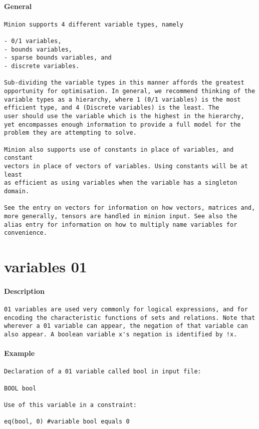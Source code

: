 \paragraph{General}
{\footnotesize
\begin{verbatim}
Minion supports 4 different variable types, namely

- 0/1 variables,
- bounds variables,
- sparse bounds variables, and
- discrete variables.

Sub-dividing the variable types in this manner affords the greatest
opportunity for optimisation. In general, we recommend thinking of the
variable types as a hierarchy, where 1 (0/1 variables) is the most
efficient type, and 4 (Discrete variables) is the least. The
user should use the variable which is the highest in the hierarchy,
yet encompasses enough information to provide a full model for the
problem they are attempting to solve.

Minion also supports use of constants in place of variables, and constant
vectors in place of vectors of variables. Using constants will be at least
as efficient as using variables when the variable has a singleton domain.

See the entry on vectors for information on how vectors, matrices and,
more generally, tensors are handled in minion input. See also the
alias entry for information on how to multiply name variables for
convenience.
\end{verbatim}
}
\section{variables 01}
\paragraph{Description}
{\footnotesize
\begin{verbatim}
01 variables are used very commonly for logical expressions, and for
encoding the characteristic functions of sets and relations. Note that
wherever a 01 variable can appear, the negation of that variable can
also appear. A boolean variable x's negation is identified by !x.
\end{verbatim}
}
\paragraph{Example}
{\footnotesize
\begin{verbatim}
Declaration of a 01 variable called bool in input file:

BOOL bool

Use of this variable in a constraint:

eq(bool, 0) #variable bool equals 0
\end{verbatim}
}
